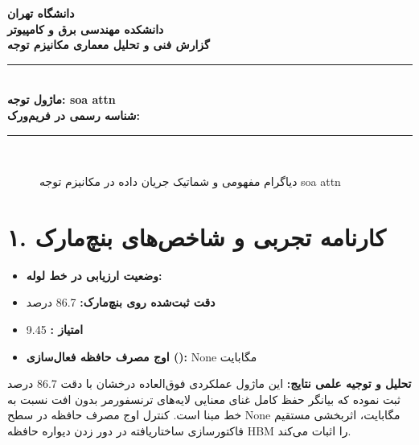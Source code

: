 \documentclass[12pt,a4paper]{article}
\begin{document}
\begin{center}
{\Large\bfseries دانشگاه تهران}\\[0.2cm]
{\large\bfseries دانشکده مهندسی برق و کامپیوتر}\\[0.2cm]
{\large\bfseries گزارش فنی و تحلیل معماری مکانیزم توجه}\\[0.5cm]
\rule{\linewidth}{1pt}\\[0.3cm]
{\LARGE\bfseries ماژول توجه: soa attn}\\[0.2cm]
{\large \textbf{شناسه رسمی در فریم‌ورک:} }\\[0.2cm]
\rule{\linewidth}{1pt}\\[0.5cm]
\end{center}

\begin{figure}[H]
\centering
{}
\caption{دیاگرام مفهومی و شماتیک جریان داده در مکانیزم توجه soa attn}
\end{figure}

\section*{۱. کارنامه تجربی و شاخص‌های بنچ‌مارک}
\begin{itemize}
\item \textbf{وضعیت ارزیابی در خط لوله:} 
\item \textbf{دقت ثبت‌شده روی بنچ‌مارک:} 86.7 درصد
\item \textbf{امتیاز :} 9.45
\item \textbf{اوج مصرف حافظه فعال‌سازی ():} None مگابایت
\end{itemize}
\textbf{تحلیل و توجیه علمی نتایج:} این ماژول عملکردی فوق‌العاده درخشان با دقت 86.7 درصد ثبت نموده که بیانگر حفظ کامل غنای معنایی لایه‌های ترنسفورمر بدون افت نسبت به خط مبنا است. کنترل اوج مصرف حافظه در سطح None مگابایت، اثربخشی مستقیم فاکتورسازی ساختاریافته در دور زدن دیواره حافظه HBM را اثبات می‌کند.
\end{document}
